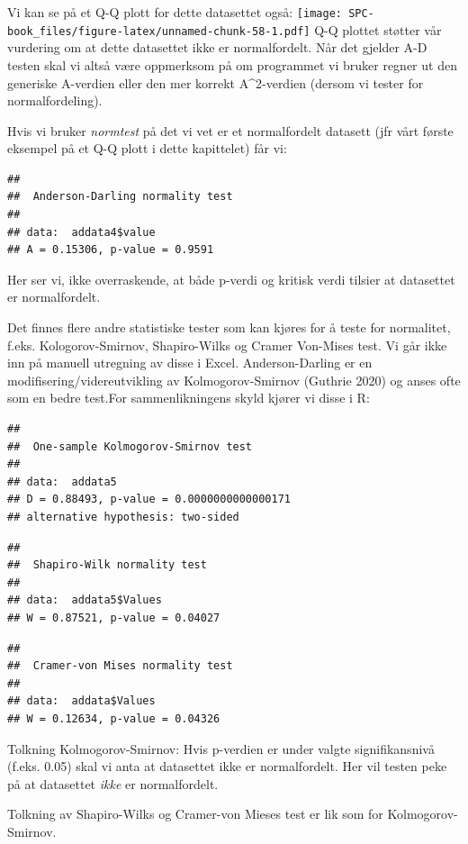 \documentclass[
]{book}
\begin{document}
Vi kan se på et Q-Q plott for dette datasettet også:
\texttt{[image: SPC-book\_files/figure-latex/unnamed-chunk-58-1.pdf]}
Q-Q plottet støtter vår vurdering om at dette datasettet ikke er normalfordelt. Når det gjelder A-D testen skal vi altså være oppmerksom på om programmet vi bruker regner ut den generiske A-verdien eller den mer korrekt A\^{}2-verdien (dersom vi tester for normalfordeling).

Hvis vi bruker \emph{normtest} på det vi vet er et normalfordelt datasett (jfr vårt første eksempel på et Q-Q plott i dette kapittelet) får vi:

\begin{verbatim}
## 
##  Anderson-Darling normality test
## 
## data:  addata4$value
## A = 0.15306, p-value = 0.9591
\end{verbatim}

Her ser vi, ikke overraskende, at både p-verdi og kritisk verdi tilsier at datasettet er normalfordelt.

Det finnes flere andre statistiske tester som kan kjøres for å teste for normalitet, f.eks. Kologorov-Smirnov, Shapiro-Wilks og Cramer Von-Mises test. Vi går ikke inn på manuell utregning av disse i Excel. Anderson-Darling er en modifisering/videreutvikling av Kolmogorov-Smirnov (Guthrie 2020) og anses ofte som en bedre test.For sammenlikningens skyld kjører vi disse i R:

\begin{verbatim}
## 
##  One-sample Kolmogorov-Smirnov test
## 
## data:  addata5
## D = 0.88493, p-value = 0.0000000000000171
## alternative hypothesis: two-sided
\end{verbatim}

\begin{verbatim}
## 
##  Shapiro-Wilk normality test
## 
## data:  addata5$Values
## W = 0.87521, p-value = 0.04027
\end{verbatim}

\begin{verbatim}
## 
##  Cramer-von Mises normality test
## 
## data:  addata$Values
## W = 0.12634, p-value = 0.04326
\end{verbatim}

Tolkning Kolmogorov-Smirnov: Hvis p-verdien er under valgte signifikansnivå (f.eks. 0.05) skal vi anta at datasettet ikke er normalfordelt. Her vil testen peke på at datasettet \emph{ikke} er normalfordelt.

Tolkning av Shapiro-Wilks og Cramer-von Mieses test er lik som for Kolmogorov-Smirnov.
\end{document}
